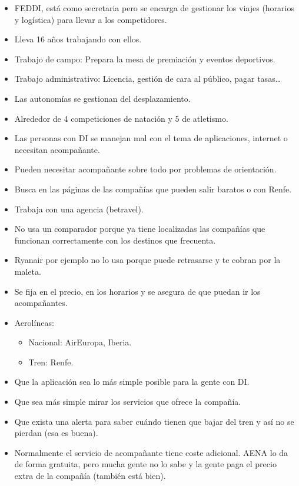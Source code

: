 \begin{itemize}
    \item FEDDI, está como secretaria pero se encarga de gestionar los viajes (horarios y logística) para llevar a los competidores.
    \item Lleva 16 años trabajando con ellos.
    \item Trabajo de campo: Prepara la mesa de premiación y eventos deportivos.
    \item Trabajo administrativo: Licencia, gestión de cara al público, pagar tasas…
    \item Las autonomías se gestionan del desplazamiento.
    \item Alrededor de 4 competiciones de natación y 5 de atletismo.
    \item Las personas con DI se manejan mal con el tema de aplicaciones, internet o necesitan acompañante.
    \item Pueden necesitar acompañante sobre todo por problemas de orientación.
    \item Busca en las páginas de las compañías que pueden salir baratos o con Renfe.
    \item Trabaja con una agencia (betravel).
    \item No usa un comparador porque ya tiene localizadas las compañías que funcionan correctamente con los destinos que frecuenta.
    \item Ryanair por ejemplo no lo usa porque puede retrasarse y te cobran por la maleta.
    \item Se fija en el precio, en los horarios y se asegura de que puedan ir los acompañantes.
    \item Aerolíneas:
    \begin{itemize}
        \item Nacional: AirEuropa, Iberia.
        \item Tren: Renfe.
    \end{itemize}
    \item Que la aplicación sea lo más simple posible para la gente con DI.
    \item Que sea más simple mirar los servicios que ofrece la compañía.
    \item Que exista una alerta para saber cuándo tienen que bajar del tren y así no se pierdan (esa es buena).
    \item Normalmente el servicio de acompañante tiene coste adicional. AENA lo da de forma gratuita, pero mucha gente no lo sabe y la gente paga el precio extra de la compañía (también está bien).
\end{itemize}


